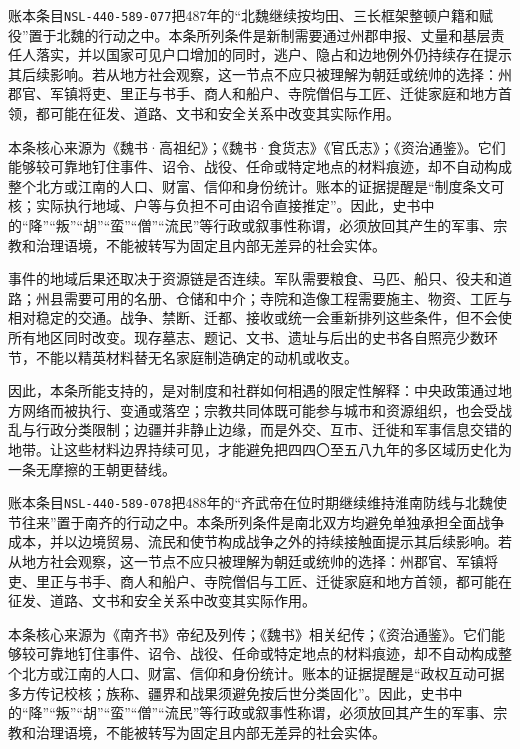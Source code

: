 账本条目\texttt{NSL-440-589-077}把487年的“北魏继续按均田、三长框架整顿户籍和赋役”置于北魏的行动之中。本条所列条件是新制需要通过州郡申报、丈量和基层责任人落实，并以国家可见户口增加的同时，逃户、隐占和边地例外仍持续存在提示其后续影响。若从地方社会观察，这一节点不应只被理解为朝廷或统帅的选择：州郡官、军镇将吏、里正与书手、商人和船户、寺院僧侣与工匠、迁徙家庭和地方首领，都可能在征发、道路、文书和安全关系中改变其实际作用。

本条核心来源为《魏书·高祖纪》；《魏书·食货志》《官氏志》；《资治通鉴》。它们能够较可靠地钉住事件、诏令、战役、任命或特定地点的材料痕迹，却不自动构成整个北方或江南的人口、财富、信仰和身份统计。账本的证据提醒是“制度条文可核；实际执行地域、户等与负担不可由诏令直接推定”。因此，史书中的“降”“叛”“胡”“蛮”“僧”“流民”等行政或叙事性称谓，必须放回其产生的军事、宗教和治理语境，不能被转写为固定且内部无差异的社会实体。

事件的地域后果还取决于资源链是否连续。军队需要粮食、马匹、船只、役夫和道路；州县需要可用的名册、仓储和中介；寺院和造像工程需要施主、物资、工匠与相对稳定的交通。战争、禁断、迁都、接收或统一会重新排列这些条件，但不会使所有地区同时改变。现存墓志、题记、文书、遗址与后出的史书各自照亮少数环节，不能以精英材料替无名家庭制造确定的动机或收支。

因此，本条所能支持的，是对制度和社群如何相遇的限定性解释：中央政策通过地方网络而被执行、变通或落空；宗教共同体既可能参与城市和资源组织，也会受战乱与行政分类限制；边疆并非静止边缘，而是外交、互市、迁徙和军事信息交错的地带。让这些材料边界持续可见，才能避免把四四〇至五八九年的多区域历史化为一条无摩擦的王朝更替线。

账本条目\texttt{NSL-440-589-078}把488年的“齐武帝在位时期继续维持淮南防线与北魏使节往来”置于南齐的行动之中。本条所列条件是南北双方均避免单独承担全面战争成本，并以边境贸易、流民和使节构成战争之外的持续接触面提示其后续影响。若从地方社会观察，这一节点不应只被理解为朝廷或统帅的选择：州郡官、军镇将吏、里正与书手、商人和船户、寺院僧侣与工匠、迁徙家庭和地方首领，都可能在征发、道路、文书和安全关系中改变其实际作用。

本条核心来源为《南齐书》帝纪及列传；《魏书》相关纪传；《资治通鉴》。它们能够较可靠地钉住事件、诏令、战役、任命或特定地点的材料痕迹，却不自动构成整个北方或江南的人口、财富、信仰和身份统计。账本的证据提醒是“政权互动可据多方传记校核；族称、疆界和战果须避免按后世分类固化”。因此，史书中的“降”“叛”“胡”“蛮”“僧”“流民”等行政或叙事性称谓，必须放回其产生的军事、宗教和治理语境，不能被转写为固定且内部无差异的社会实体。

